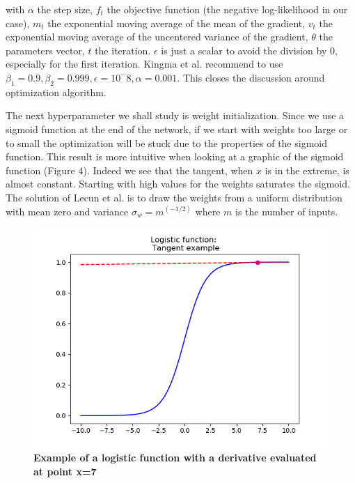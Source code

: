 \documentclass[a4paper,12pt]{article}
\numberwithin{equation}{section}
\begin{document}
with $\alpha$ the step size, $f_t$ the objective function (the negative log-likelihood in our case), $m_t$ the exponential moving average of the mean of the gradient, $v_t$ the exponential moving average of the uncentered variance of the gradient, $\theta$ the parameters vector, $t$ the iteration. $\epsilon$ is just a scalar to avoid the division by 0, especially for the first iteration. Kingma et al. recommend to use $\beta_1=0.9, \beta_2=0.999, \epsilon = 10^-8, \alpha = 0.001$. This closes the discussion around optimization algorithm.


The next hyperparameter we shall study is weight initialization. Since we use a sigmoid function at the end of the network, if we start with weights too large or to small the optimization will be stuck due to the properties of the sigmoid function. This result is more intuitive when looking at a graphic of the sigmoid function (Figure 4). Indeed we see that the tangent, when $x$ is in the extreme, is almost constant. Starting with high values for the weights saturates the sigmoid. The solution of Lecun et al. is to draw the weights from a uniform distribution with mean zero and variance $\sigma_w=m^{(-1/2)}$ where $m$ is the number of inputs.

\begin{figure}[htb]%
    \begin{center}
    \includegraphics[scale = 0.7]{Figure2ANN.png}%
    \caption{\textbf{Example of a logistic function with a derivative evaluated at point x=7}}
    \label{fig4:ANN architecture}%
    \end{center}
\end{figure}
\end{document}
